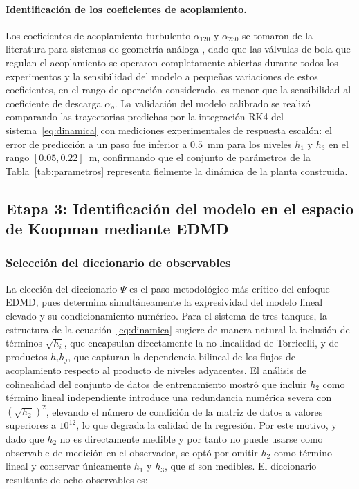 \documentclass[12pt,letterpaper]{article}
\begin{document}
\paragraph{Identificación de los coeficientes de acoplamiento.}
Los coeficientes de acoplamiento turbulento $\alpha_{120}$ y $\alpha_{230}$ 
se tomaron de la literatura para sistemas de geometría análoga 
\cite{johansson2000, tuwien2025}, dado que las válvulas de bola que 
regulan el acoplamiento se operaron completamente abiertas durante todos 
los experimentos y la sensibilidad del modelo a pequeñas variaciones de 
estos coeficientes, en el rango de operación considerado, es menor que la 
sensibilidad al coeficiente de descarga $\alpha_o$. La validación del 
modelo calibrado se realizó comparando las trayectorias predichas por la 
integración RK4 del sistema~\eqref{eq:dinamica} con mediciones 
experimentales de respuesta escalón: el error de predicción a un paso 
fue inferior a $0.5$~mm para los niveles $h_1$ y $h_3$ en el rango 
$[0.05, 0.22]$~m, confirmando que el conjunto de parámetros de la 
Tabla~\ref{tab:parametros} representa fielmente la dinámica de la planta 
construida.

\subsection{Etapa 3: Identificación del modelo en el espacio de Koopman 
mediante EDMD}
\label{sec:edmd_ident}

\subsubsection{Selección del diccionario de observables}

La elección del diccionario $\Psi$ es el paso metodológico más crítico 
del enfoque EDMD, pues determina simultáneamente la expresividad del 
modelo lineal elevado y su condicionamiento numérico. Para el sistema de 
tres tanques, la estructura de la ecuación~\eqref{eq:dinamica} sugiere 
de manera natural la inclusión de términos $\sqrt{h_i}$, que encapsulan 
directamente la no linealidad de Torricelli, y de productos $h_i h_j$, 
que capturan la dependencia bilineal de los flujos de acoplamiento 
respecto al producto de niveles adyacentes. El análisis de colinealidad 
del conjunto de datos de entrenamiento mostró que incluir $h_2$ como 
término lineal independiente introduce una redundancia numérica severa 
con $(\sqrt{h_2})^2$, elevando el número de condición de la matriz de 
datos a valores superiores a $10^{12}$, lo que degrada la calidad de la 
regresión. Por este motivo, y dado que $h_2$ no es directamente medible 
y por tanto no puede usarse como observable de medición en el observador, 
se optó por omitir $h_2$ como término lineal y conservar únicamente $h_1$ 
y $h_3$, que sí son medibles. El diccionario resultante de ocho 
observables es:
\end{document}
